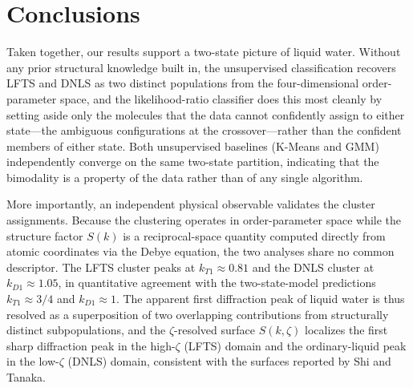 \documentclass[aps, amsmath,amssymb, reprint, twocolumn, superscriptaddress]{revtex4-2}
\begin{document}

\section{Conclusions}
\label{sec:discussion}

Taken together, our results support a two-state picture of liquid water. Without any prior structural knowledge built in, the unsupervised classification recovers LFTS and DNLS as two distinct populations from the four-dimensional order-parameter space, and the likelihood-ratio classifier does this most cleanly by setting aside only the molecules that the data cannot confidently assign to either state---the ambiguous configurations at the crossover---rather than the confident members of either state. Both unsupervised baselines (K-Means and GMM) independently converge on the same two-state partition, indicating that the bimodality is a property of the data rather than of any single algorithm.

More importantly, an independent physical observable validates the cluster assignments. Because the clustering operates in order-parameter space while the structure factor $S(k)$ is a reciprocal-space quantity computed directly from atomic coordinates via the Debye equation, the two analyses share no common descriptor. The LFTS cluster peaks at $k_{T1} \approx 0.81$ and the DNLS cluster at $k_{D1} \approx 1.05$, in quantitative agreement with the two-state-model predictions $k_{T1} \approx 3/4$ and $k_{D1} \approx 1$. The apparent first diffraction peak of liquid water is thus resolved as a superposition of two overlapping contributions from structurally distinct subpopulations, and the $\zeta$-resolved surface $S(k,\zeta)$ localizes the first sharp diffraction peak in the high-$\zeta$ (LFTS) domain and the ordinary-liquid peak in the low-$\zeta$ (DNLS) domain, consistent with the surfaces reported by Shi and Tanaka.
\end{document}
